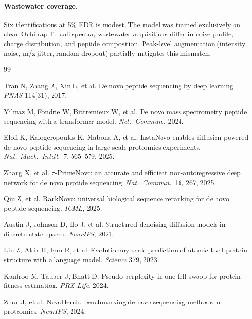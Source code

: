 \documentclass[11pt]{article}
\begin{document}
\paragraph{Wastewater coverage.}
Six identifications at 5\% FDR is modest. The model was trained exclusively on
clean Orbitrap E.~coli spectra; wastewater acquisitions differ in noise profile,
charge distribution, and peptide composition. Peak-level augmentation (intensity
noise, m/z jitter, random dropout) partially mitigates this mismatch.


\begin{thebibliography}{99}
\small

 Tran N, Zhang A, Xin L, et al. De novo peptide sequencing by deep learning. \textit{PNAS} 114(31), 2017.

 Yilmaz M, Fondrie W, Bittremieux W, et al. De novo mass spectrometry peptide sequencing with a transformer model. \textit{Nat.~Commun.}, 2024.

 Eloff K, Kalogeropoulos K, Mabona A, et al. InstaNovo enables diffusion-powered de novo peptide sequencing in large-scale proteomics experiments. \textit{Nat.~Mach.~Intell.}~7, 565--579, 2025.

 Zhang X, et al. $\pi$-PrimeNovo: an accurate and efficient non-autoregressive deep network for de novo peptide sequencing. \textit{Nat.~Commun.}~16, 267, 2025.

 Qiu Z, et al. RankNovo: universal biological sequence reranking for de novo peptide sequencing. \textit{ICML}, 2025.

 Austin J, Johnson D, Ho J, et al. Structured denoising diffusion models in discrete state-spaces. \textit{NeurIPS}, 2021.

 Lin Z, Akin H, Rao R, et al. Evolutionary-scale prediction of atomic-level protein structure with a language model. \textit{Science} 379, 2023.

 Kantroo M, Tauber J, Bhatt D. Pseudo-perplexity in one fell swoop for protein fitness estimation. \textit{PRX Life}, 2024.

 Zhou J, et al. NovoBench: benchmarking de novo sequencing methods in proteomics. \textit{NeurIPS}, 2024.

\end{thebibliography}
\end{document}

